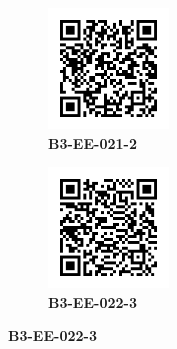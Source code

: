\documentclass{article}
\begin{document}
	\begin{figure}[]
		\centering
		\begin{subfigure}{0.19\textwidth}
			\centering
			\includegraphics[width = 3.2cm,height = 3.2cm]{B3-EE-021-2}
			\caption*{\large{\textbf{B3-EE-021-2}}}
		\end{subfigure}\hfil
		\begin{subfigure}{0.19\textwidth}
			\centering
			\includegraphics[width = 3.2cm,height = 3.2cm]{B3-EE-022-3}
			\caption*{\large{\textbf{B3-EE-022-3}}}
		\end{subfigure}\hfil
	\end{figure}
\end{document}
